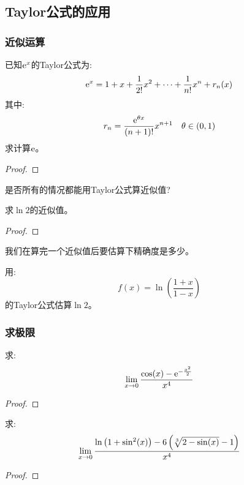 \subsection{Taylor公式的应用}
\subsubsection{近似运算}
\begin{example}
    已知$\mathrm{e}^x$的Taylor公式为:
    \begin{equation*}
        \mathrm{e}^x = 1 + x + \frac{1}{2!}x^2 + \cdots + \frac{1}{n!}x^n + r_n(x)
    \end{equation*}
    其中:
    \begin{equation*}
        r_n = \frac{\mathrm{e}^{\theta x}}{(n+1)!}x^{n+1} \quad \theta \in (0, 1)
    \end{equation*}
    求计算$\mathrm{e}$。
\end{example}
\begin{proof}
    
\end{proof}
是否所有的情况都能用Taylor公式算近似值?
\begin{example}
    求$\ln2$的近似值。
\end{example}
\begin{proof}
    
\end{proof}
\begin{remark}
    我们在算完一个近似值后要估算下精确度是多少。
\end{remark}

\begin{example}
    用:
    \begin{equation*}
        f(x) = \ln\left(\frac{1+x}{1-x}\right)
    \end{equation*}
    的Taylor公式估算$\ln2$。
\end{example}

\subsubsection{求极限}
\begin{example}
    求:
    \begin{equation*}
        \lim_{x \to 0 } \frac{\cos(x) - \mathrm{e}^{-\frac{x^2}{2}}}{x^4}
    \end{equation*}    
\end{example}
\begin{proof}
    
\end{proof}

\begin{example}
    求:
    \begin{equation*}
        \lim_{x \to 0 } \frac{\ln\left(1+\sin^2(x)\right)-6\left(\sqrt[3]{2-\sin(x)}-1\right)}{x^4}
    \end{equation*}
\end{example}
\begin{proof}
    
\end{proof}